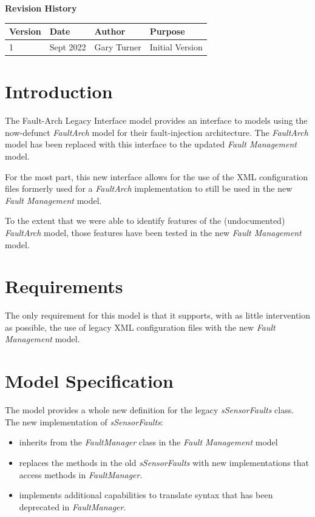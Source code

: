 \documentclass[11pt,fleqn]{report}
\begin{document}
\titlePage
\clearpage %
\tableofcontents %
\vfill
{\Large \textbf {Revision History}}
{\large
\begin{center}
\begin{tabular}{|l||l|l|l|}
\hline
 \textbf{Version} & \textbf{Date} & \textbf{Author} & \textbf{Purpose} \\ \hline
 \hline
1 & Sept 2022 & Gary Turner & Initial Version \\ \hline
\end{tabular}
\end{center}
}

\chapter{Introduction} %
The Fault-Arch Legacy Interface model provides an interface to models using
the now-defunct \textit{FaultArch} model for their fault-injection
architecture. The \textit{FaultArch} model has been replaced with this
interface to the updated \textit{Fault Management} model.

For the most part, this new interface allows for the use of
the XML configuration files formerly used for a \textit{FaultArch}
implementation to still be used in the new \textit{Fault Management} model.

To the extent that we were able to identify features of the (undocumented)
\textit{FaultArch} model, those features have been tested in the new
\textit{Fault Management} model.

\chapter {Requirements}
The only requirement for this model is that it supports, with as little
intervention as possible, the use of legacy XML configuration files with the
new \textit{Fault Management} model.


\chapter {Model Specification}
The model provides a whole new definition for the legacy
\textit{sSensorFaults} class. The new implementation of
\textit{sSensorFaults}:
\begin{itemize}
\item inherits from the \textit{FaultManager} class in the \textit{Fault
Management} model
\item replaces the methods in the old \textit{sSensorFaults} with new
implementations that access methods in \textit{FaultManager}.
\item implements additional capabilities to translate syntax that has been
deprecated in \textit{FaultManager}.
\end{itemize}
\end{document}
